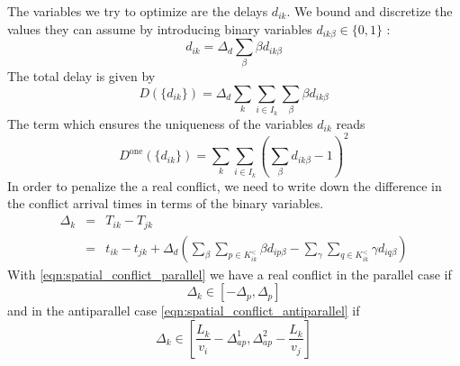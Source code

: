 \documentclass{article}
\begin{document}
The variables we try to optimize are the delays $d_{ik}$.
We bound and discretize the values they can assume by introducing binary variables $d_{ik\beta}\in\{0, 1\}$ :
\begin{equation*}
    d_{ik} = \Delta_d \sum_\beta \beta d_{ik\beta}
\end{equation*}
The total delay is given by
\begin{equation}
    D(\{d_{ik}\}) = \Delta_d \sum_k \sum_{i \in I_k} \sum_\beta \beta d_{ik\beta}
\end{equation}
The term which ensures the uniqueness of the variables $d_{ik}$ reads
\begin{equation}
    D^\text{one}(\{d_{ik}\})  =  \sum_k \sum_{i \in I_k} \left( \sum_\beta d_{ik\beta} - 1\right)^2
\end{equation}
In order to penalize the a real conflict, we need to write down the difference in the conflict arrival times in terms of the binary variables.
\begin{eqnarray*}
    \Delta_k &=& T_{ik} - T_{jk} \\
             &=& t_{ik} - t_{jk} + \Delta_d \left( \sum_\beta \sum_{p\in K^<_{ik}} \beta d_{ip\beta}  - \sum_\gamma \sum_{q\in K^<_{ik}} \gamma d_{iq\beta} \right)
\end{eqnarray*}
With \eqref{eqn:spatial_conflict_parallel} we have a real conflict in the parallel case if
\begin{equation*}
    \Delta_k \in [-\Delta_p, \Delta_p]
\end{equation*}
and in the antiparallel case \eqref{eqn:spatial_conflict_antiparallel} if
\begin{equation*}
    \Delta_k \in \left[\frac{L_k}{v_i} - \Delta^1_{ap}, \Delta^2_{ap} - \frac{L_k}{v_j}\right]
\end{equation*}
\end{document}
